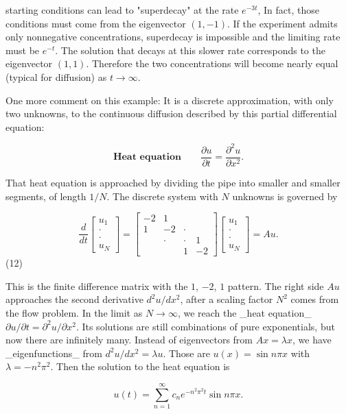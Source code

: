 starting conditions can lead to "superdecay" at the rate \(e^{-3t}\), In fact, those conditions must come from the eigenvector \((1,-1)\). If the experiment admits only nonnegative concentrations, superdecay is impossible and the limiting rate must be \(e^{-t}\). The solution that decays at this slower rate corresponds to the eigenvector \((1,1)\). Therefore the two concentrations will become nearly equal (typical for diffusion) as \(t\to\infty\).

One more comment on this example: It is a discrete approximation, with only two unknowns, to the continuous diffusion described by this partial differential equation:

\[\textbf{Heat equation}\qquad\frac{\partial u}{\partial t}=\frac{\partial^{2}u }{\partial x^{2}}.\]

That heat equation is approached by dividing the pipe into smaller and smaller segments, of length \(1/N\). The discrete system with \(N\) unknowns is governed by

\[\frac{d}{dt}\begin{bmatrix}u_{1}\\ \cdot\\ \cdot\\ u_{N}\end{bmatrix}=\begin{bmatrix}-2&1&&\\ 1&-2&\cdot&\\ &\cdot&\cdot&1\\ &&1&-2\end{bmatrix}\begin{bmatrix}u_{1}\\ \cdot\\ \cdot\\ u_{N}\end{bmatrix}=Au.\] (12)

This is the finite difference matrix with the \(1\), \(-2\), \(1\) pattern. The right side \(Au\) approaches the second derivative \(d^{2}u/dx^{2}\), after a scaling factor \(N^{2}\) comes from the flow problem. In the limit as \(N\to\infty\), we reach the _heat equation_\(\partial u/\partial t=\partial^{2}u/\partial x^{2}\). Its solutions are still combinations of pure exponentials, but now there are infinitely many. Instead of eigenvectors from \(Ax=\lambda x\), we have _eigenfunctions_ from \(d^{2}u/dx^{2}=\lambda u\). Those are \(u(x)=\sin n\pi x\) with \(\lambda=-n^{2}\pi^{2}\). Then the solution to the heat equation is

\[u(t)=\sum_{n=1}^{\infty}c_{n}e^{-n^{2}\pi^{2}t}\sin n\pi x.\]

